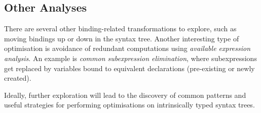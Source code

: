\documentclass[11pt,a4paper]{article}
\begin{document}
\subsection{Other Analyses}

There are several other binding-related transformations to explore,
such as moving bindings up or down in the syntax tree.
Another interesting type of optimisation is avoidance of redundant computations
using \emph{available expression analysis}.
An example is \emph{common subexpression elimination},
where subexpressions get replaced by variables bound to equivalent declarations
(pre-existing or newly created).

Ideally, further exploration will lead to the discovery of common patterns
and useful strategies for performing optimisations on intrinsically typed syntax trees.


\pagebreak

{}
\end{document}
